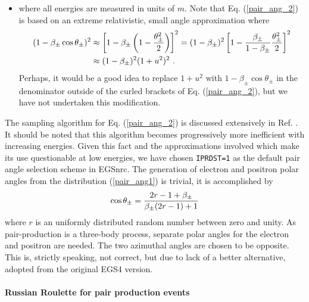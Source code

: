 \begin{itemize}
\item[\phantom{\tt IPRDST=2}]
where all energies are measured in units of $m$. 
Note that Eq. (\ref{pair_ang_2}) is based on an extreme relativistic, 
small angle approximation where 
\begin{equation}
\begin{split}
(1 - \beta_\pm \cos \theta_\pm)^2 & \approx 
\left[1 - \beta_\pm \left(1 - \frac{\theta_\pm^2}{2}\right) \right]^2 
= (1 - \beta_\pm)^2 \left[ 1 - {\beta_\pm \over 1 - \beta_\pm} 
\frac{\theta_\pm^2}{2} \right]^2 \\
& \approx  (1 - \beta_\pm)^2 (1 + u^2)^2~.
\end{split}
\end{equation}
Perhaps, it would be a good idea to replace $1+u^2$ with 
$1 - \beta_\pm \cos \theta_\pm$ in the denominator outside 
of the curled brackets of Eq. (\ref{pair_ang_2}), but 
we have not undertaken this modification.   
\end{itemize} 

The sampling algorithm for Eq. (\ref{pair_ang_2}) is discussed 
extensively in Ref. \cite{Bi91}. 
It should be noted that 
this algorithm becomes progressively more inefficient with 
increasing energies. Given this fact and the approximations 
involved which make its use questionable at low energies, 
we have chosen {\tt IPRDST=1} as the default 
pair angle selection scheme in EGSnrc. The generation 
of electron and positron polar angles from the 
distribution (\ref{pair_ang1}) is trivial, it 
is accomplished by 
\begin{equation}
\cos \theta_\pm = {2 r - 1 + \beta_\pm \over \beta_\pm (2 r -1 ) + 1}
\end{equation}
where $r$ is an uniformly distributed random number between zero and 
unity. As pair-production is a three-body process, separate polar 
angles for the electron and positron are needed. The two 
azimuthal angles are chosen to be opposite. This is, 
strictly speaking, not correct, but due to lack of a better 
alternative, adopted from the original EGS4 version.

\paragraph{Russian Roulette for pair production events} \hfill
{}

